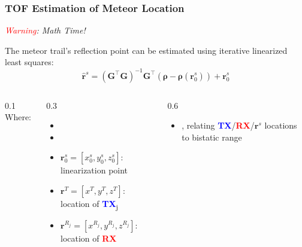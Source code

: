 \begin{frame}[t, label=gnss_ls]
    \frametitle{TOF Estimation of Meteor Location}
    \begin{center}
        \textit{\textcolor{red}{Warning}: Math Time!}
    \end{center}
    
    The meteor trail's reflection point can be estimated using \alert{iterative linearized least squares}: 
    \begin{equation*}
        \hat{\mathbf{r}}^s = \left( \mathbf{G}^{\top} \mathbf{G} \right)^{-1} \mathbf{G}^{\top} \left(\boldsymbol{\rho} - \boldsymbol{\rho}(\mathbf{r}^s_0)  \right) + \mathbf{r}_0^s
    \end{equation*}
    \begin{columns}[t]
        \begin{column}{0.1\linewidth}
            Where:
        \end{column}
        \begin{column}{0.3\linewidth}
            {\setlength{\leftmargini}{0em} \begin{itemize} \scriptsize \vspace{-1.5\baselineskip}%
                \item[\(\blacktriangleright\)] 
                \item[\(\blacktriangleright\)] 
                \item[\(\blacktriangleright\)] \(\mathbf{r}^s_0 = [x_0^s, y_0^s, z_0^s]\): linearization point
                \item[\(\blacktriangleright\)] \(\mathbf{r}^T = [x^{T}, y^{T}, z^{T}]\): location of \textcolor{blue}{\textbf{TX}}\textsubscript{j}
                \item[\(\blacktriangleright\)] \(\mathbf{r}^{R_j} = [x^{R_j}, y^{R_j}, z^{R_j}]\): location of \textcolor{red}{\textbf{RX}}
            \end{itemize}}
        \end{column}
        \begin{column}{0.6\linewidth}
            {\setlength{\leftmargini}{0em} \begin{itemize} \scriptsize \vspace{-1.5\baselineskip}%
                \item[\(\blacktriangleright\)] , relating \textcolor{blue}{\textbf{TX}}/\textcolor{red}{\textbf{RX}}/\(\mathbf{r}^s\) locations to bistatic range

\end{itemize}}
\end{column}
\end{columns}
\end{frame}
